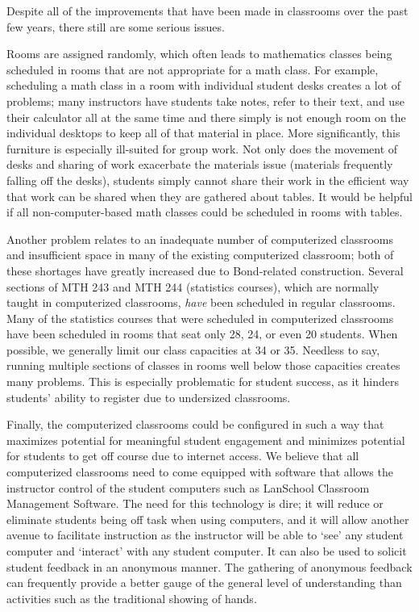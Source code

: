 Despite all of the improvements that have been made in classrooms over the past few years, there still are some serious issues.

Rooms are assigned randomly, which often leads to mathematics classes being scheduled in rooms that are not appropriate for a math class.
For example, scheduling a math class in a room with individual student desks creates a lot of problems; many instructors have students take notes, refer to their text, and use their calculator all at the same time and there simply is not enough room on the individual desktops to keep all of that material in place.
More significantly,  this furniture is especially ill-suited for group work.
Not only does the movement of desks and sharing of work exacerbate the materials issue (materials frequently falling off the desks), students simply cannot share their work in the efficient way that work can be shared when they are gathered about tables.
It would be helpful if all non-computer-based math classes could be scheduled in rooms with tables.

Another problem relates to an inadequate number of computerized classrooms and insufficient space in many of the existing computerized classroom;  both of these shortages have greatly increased due to Bond-related construction.
Several sections of MTH 243 and MTH 244 (statistics courses), which are normally taught in computerized classrooms, \emph{have} been scheduled in regular classrooms.
Many of the statistics courses that were scheduled in computerized classrooms have been scheduled in rooms that seat only 28, 24, or even 20 students.
When possible, we generally limit our class capacities at 34 or 35.
Needless to say, running multiple sections of classes in rooms well below those capacities creates many problems.
This is especially  problematic for student success, as it hinders students'  ability to register due to undersized classrooms.

Finally, the computerized classrooms could be configured in such a way that maximizes potential for meaningful student engagement and minimizes potential for students to get off course due to internet access.
We believe that all computerized classrooms need to come equipped with software that allows the instructor control of the student computers such as LanSchool Classroom Management Software.
The need for this technology is dire; it will reduce or eliminate students being off task when using computers, and it will allow another avenue to facilitate instruction as the instructor will be able to `see' any student computer and `interact' with any student computer.
It can also be used to solicit student feedback in an anonymous manner.
The gathering of anonymous feedback can frequently provide a better gauge of the general level of understanding than activities such as the traditional showing of hands.

